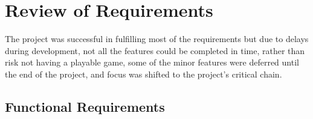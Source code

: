\section{Review of Requirements}
\label{sec:reviewrequirements}

The project was successful in fulfilling most of the requirements but due to delays during development, not all the features could be completed in time, rather than risk not having a playable game, some of the minor features were deferred until the end of the project, and focus was shifted to the project's critical chain.

\subsection{Functional Requirements}

